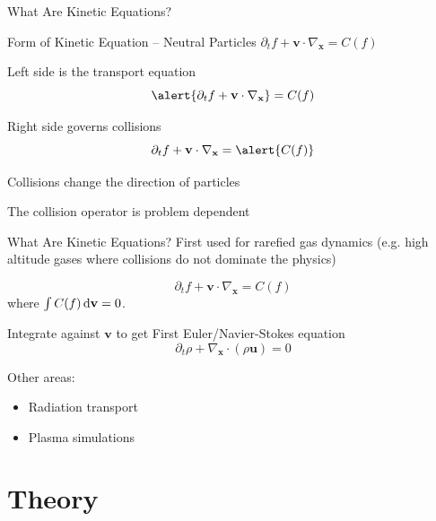 \documentclass{beamer}
\renewcommand{\vec}[1]{\ensuremath{\mathbf{#1}}}
\begin{document}
    \begin{frame}{What Are Kinetic Equations?}
        \begin{block}{Form of Kinetic Equation -- Neutral Particles}
            $\partial_t f + \vec{v} \cdot \nabla_\vec{x} = C(f)$
        \end{block}

        \vfill

        Left side is the transport equation
        \[\alert{\partial_t f + \vec{v} \cdot \nabla_\vec{x}} = C(f)\]

        \vfill

        Right side governs collisions
        \[\partial_t f + \vec{v} \cdot \nabla_\vec{x} = \alert{C(f)}\]
        \vfill

        Collisions change the direction of particles

        The collision operator is problem dependent
    \end{frame}

    \begin{frame}{What Are Kinetic Equations?}
        First used for rarefied gas dynamics (e.g. high altitude gases where collisions do not dominate the physics)

        \[\partial_t f + \vec{v} \cdot \nabla_\vec{x} = C(f)\]
        where $\int C(f) \dif \vec{v} = 0$.

        \vfill

        Integrate against \vec{v} to get First Euler/Navier-Stokes equation
        \[\partial_t \rho + \nabla_{\vec{x}} \cdot (\rho \vec{u}) = 0\]

        \vfill

        Other areas:
        \begin{itemize}
            \item Radiation transport
            \item Plasma simulations
        \end{itemize}
    \end{frame}

\section{Theory}
\end{document}
